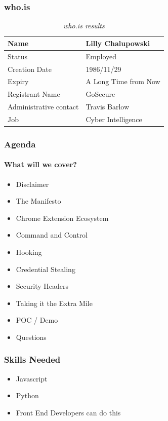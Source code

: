 \documentclass[aspectratio=169]{beamer}
\begin{document}
\begin{frame}
  \frametitle{who.is}
  \begin{table}
    \caption{\textit{who.is results}}
    \begin{tabularx}{\textwidth}{|X|X|}
      \hline
      Name & Lilly Chalupowski \\
      \hline
      Status & Employed \\
      \hline
      Creation Date & 1986/11/29 \\
      \hline
      Expiry & A Long Time from Now \\
      \hline
      Registrant Name & GoSecure \\
      \hline
      Administrative contact & Travis Barlow \\
      \hline
      Job & Cyber Intelligence \\
      \hline
    \end{tabularx}
  \end{table}
\end{frame}
\begin{frame}
  \frametitle{Agenda}
  \framesubtitle{What will we cover?}
  \begin{itemize}
  \item Disclaimer
  \item The Manifesto
  \item Chrome Extension Ecosystem
  \item Command and Control
  \item Hooking
  \item Credential Stealing
  \item Security Headers
  \item Taking it the Extra Mile
  \item POC / Demo
  \item Questions
  \end{itemize}
\end{frame}
\begin{frame}
  \frametitle{Skills Needed}
  \begin{itemize}
  \item Javascript
  \item Python
  \item Front End Developers can do this
  \end{itemize}
\end{frame}
\end{document}
